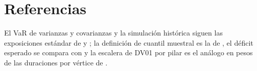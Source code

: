 \section{Referencias}\label{sec:cap09-referencias}

El VaR de varianzas y covarianzas y la simulación histórica siguen las exposiciones estándar de \citet{jorion2007} y \citet{mcneil2015}; la definición de cuantil muestral es la de \citet{hyndman1996}, el déficit esperado se compara con \citet{acerbi2002} y la escalera de DV01 por pilar es el análogo en pesos de las duraciones por vértice de \citet{ho1992}.
